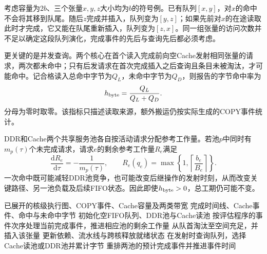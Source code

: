 考虑容量为$2b$、三个张量$x,y,z$大小均为$b$的符号例。已有队列$[x,y]$，对$x$的命中不会将其移到队尾。随后$z$完成并插入，队列变为$[y,z]$；如果先前对$x$的在途读取此时才完成，它又能在队尾重新插入，队列变为$[z,x]$。同一组张量的访问次数并不足以确定这段队列演化，完成事件的先后与查询先后都必须考虑。

更关键的是并发查询。两个核心在首个读入完成前向空Cache发射相同张量的请求，两次都未命中；只有后发请求在首次完成插入之后查询且条目未被淘汰，才可能命中。记合格读入总命中字节为$Q_L$，未命中字节为$Q_D$，则报告的字节命中率为
\begin{equation}
h_{\rm byte}=\frac{Q_L}{Q_L+Q_D}.
\label{eq:hit-rate}
\end{equation}
分母为零时取零。该指标只描述读取来源，额外搬运仍按实际生成的COPY事件统计。

DDR和Cache两个共享服务池各自按活动请求分配参考工作量。若池$p$中同时有$m_p(\tau)$个未完成请求，请求$e$的剩余参考工作量$R_e$满足
\begin{equation}
\frac{\mathrm dR_e}{\mathrm d\tau}=-\frac{1}{m_p(\tau)},\qquad
R_e(q_e)=\max\left\{1,\left\lceil\frac{b_e}{B_e}\right\rceil\right\}.
\label{eq:c-service}
\end{equation}
一次命中既可能减轻DDR池竞争，也可能改变后继操作的发射时刻，从而改变关键路径、另一池负载及后续FIFO状态。因此即使$h_{\rm byte}>0$，总工期仍可能不变。

\begin{algorithm}[H]\caption{评估程序中只读FIFO Cache的事件规则}\label{alg:c-fifo}
\begin{algorithmic}[1]
\REQUIRE 已展开的核级执行图、COPY事件、Cache容量及两类带宽
\ENSURE 完成时间线、Cache事件、命中与未命中字节
\STATE 初始化空FIFO队列、DDR池与Cache读池
\STATE 按评估程序的事件次序处理当前完成事件，推进相应池的剩余工作量
\STATE 从队首淘汰至空间充足，并插入该张量
\ENDIF
\ENDFOR
\STATE 更新依赖、流水线与跨核释放就绪状态
\STATE 在发射时查询队列，选择Cache读池或DDR池并累计字节
\ENDFOR
\STATE 重排两池的预计完成事件并推进事件时间
\ENDWHILE
\end{algorithmic}\end{algorithm}
